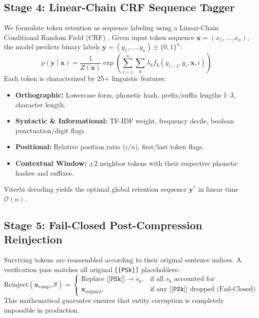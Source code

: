 \subsection{Stage 4: Linear-Chain CRF Sequence Tagger}
We formulate token retention as sequence labeling using a Linear-Chain Conditional Random Field (CRF) \cite{lafferty2001conditional}. Given input token sequence $\mathbf{x} = (x_1, \dots, x_n)$, the model predicts binary labels $\mathbf{y} = (y_1, \dots, y_n) \in \{0, 1\}^n$:
\begin{equation}
    p(\mathbf{y} \mid \mathbf{x}) = \frac{1}{Z(\mathbf{x})} \exp \left( \sum_{i=1}^n \sum_{k} \lambda_k f_k(y_{i-1}, y_i, \mathbf{x}, i) \right)
\end{equation}
Each token is characterized by 25+ linguistic features:
\begin{itemize}
    \item \textbf{Orthographic:} Lowercase form, phonetic hash, prefix/suffix lengths 1--3, character length.
    \item \textbf{Syntactic \& Informational:} TF-IDF weight, frequency decile, boolean punctuation/digit flags.
    \item \textbf{Positional:} Relative position ratio ($i/n$), first/last token flags.
    \item \textbf{Contextual Window:} $\pm 2$ neighbor tokens with their respective phonetic hashes and suffixes.
\end{itemize}
Viterbi decoding yields the optimal global retention sequence $\mathbf{y}^*$ in linear time $\mathcal{O}(n)$.

\subsection{Stage 5: Fail-Closed Post-Compression Reinjection}
Surviving tokens are reassembled according to their original sentence indices. A verification pass matches all original \texttt{[[PSk]]} placeholders:
\begin{equation}
    \text{Reinject}(\mathbf{x}_{\text{comp}}, \mathcal{S}) = 
    \begin{cases}
        \text{Replace } \texttt{[[PSk]]} \to s_k, & \text{if all } s_k \text{ accounted for} \\
        \mathbf{x}_{\text{original}}, & \text{if any } \texttt{[[PSk]]} \text{ dropped (Fail-Closed)}
    \end{cases}
\end{equation}
This mathematical guarantee ensures that entity corruption is completely impossible in production.


